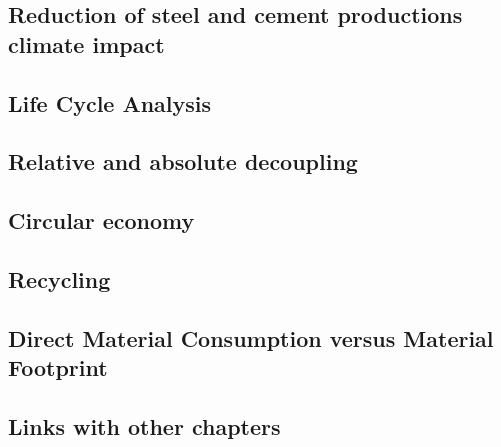 \documentclass[../summary.tex]{subfiles}
\begin{document}
	\subsection{Reduction of steel and cement productions climate impact}
	
	\subsection{Life Cycle Analysis}
	
	\subsection{Relative and absolute decoupling}
	
	\subsection{Circular economy}
	
	\subsection{Recycling}
	
	\subsection{Direct Material Consumption versus Material Footprint}
	
	\subsection{Links with other chapters}
	
	
\end{document}
